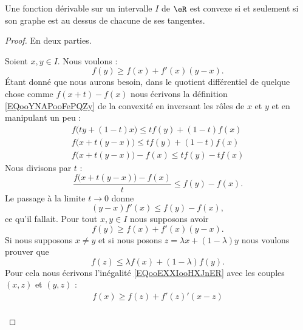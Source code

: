 \begin{proposition} \label{PROPooQPOSooDZlUAJ}
	Une fonction dérivable sur un intervalle \( I\) de \( \eR\) est convexe si et seulement si son graphe est au dessus de chacune de ses tangentes.
\end{proposition}

\begin{proof}
	En deux parties.
	\begin{subproof}
		Soient \( x,y\in I\). Nous voulons :
		\begin{equation}
			f(y)\geq f(x)+f'(x)(y-x).
		\end{equation}
		Étant donné que nous aurons besoin, dans le quotient différentiel de quelque chose comme \( f(x+t)-f(x)\) nous écrivons la définition \eqref{EQooYNAPooFePQZy} de la convexité en inversant les rôles de \( x\) et \( y\) et en manipulant un peu :
		\begin{subequations}
			\begin{align}
				f\big( ty+(1-t)x \big)\leq tf(y)+(1-t)f(x) \\
				f\big( x+t(y-x) \big)\leq tf(y)+(1-t)f(x)  \\
				f\big(  x+t(y-x)  \big)-f(x)\leq tf(y)-tf(x)
			\end{align}
		\end{subequations}
		Nous divisons par \( t\) :
		\begin{equation}
			\frac{ f\big( x+t(y-x) \big)-f(x) }{ t }\leq f(y)-f(x).
		\end{equation}
		Le passage à la limite \( t\to 0\) donne
		\begin{equation}
			(y-x)f'(x)\leq f(y)-f(x),
		\end{equation}
		ce qu'il fallait.
		Pour tout \( x,y\in I\) nous supposons avoir
		\begin{equation}        \label{EQooEXXIooHXJnER}
			f(y)\geq f(x)+f'(x)(y-x).
		\end{equation}
		Si nous supposons \( x\neq y\) et si nous posons \( z=\lambda x+(1-\lambda)y\) nous voulons prouver que
		\begin{equation}
			f(z)\leq \lambda f(x)+(1-\lambda)f(y).
		\end{equation}
		Pour cela nous écrivons l'inégalité \eqref{EQooEXXIooHXJnER} avec les couples \( (x,z)\) et \( (y,z)\) :
		\begin{subequations}
			\begin{align}
				f(x)\geq f(z)+f'(z)'(x-z) \\

\end{align}
\end{subequations}
\end{subproof}
\end{proof}
